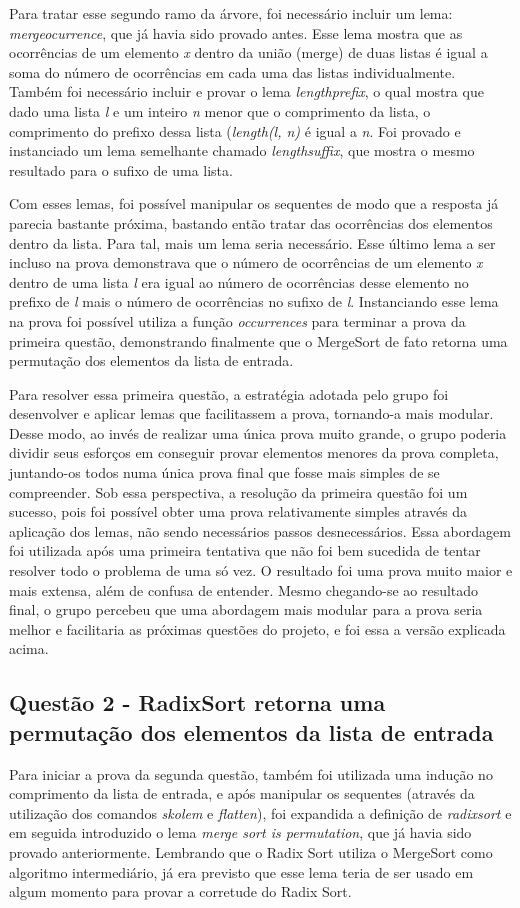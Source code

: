 \documentclass[12pt]{article}
\begin{document}
Para tratar esse segundo ramo da árvore, foi necessário incluir um lema: \textit{mergeocurrence}, que já havia sido provado antes. Esse lema mostra que as ocorrências de um elemento \textit{x} dentro da união (merge) de duas listas é igual a soma do número de ocorrências em cada uma das listas individualmente. Também foi necessário incluir e provar o lema \textit{lengthprefix}, o qual mostra que dado uma lista \textit{l} e um inteiro \textit{n} menor que o comprimento da lista, o comprimento do prefixo dessa lista (\textit{length(l, n)} é igual a \textit{n}. Foi provado e instanciado um lema semelhante chamado \textit{lengthsuffix}, que mostra o mesmo resultado para o sufixo de uma lista.

Com esses lemas, foi possível manipular os sequentes de modo que a resposta já parecia bastante próxima, bastando então tratar das ocorrências dos elementos dentro da lista. Para tal, mais um lema seria necessário. Esse último lema a ser incluso na prova demonstrava que o número de ocorrências de um elemento \textit{x} dentro de uma lista \textit{l} era igual ao número de ocorrências desse elemento no prefixo de \textit{l} mais o número de ocorrências no sufixo de \textit{l}. Instanciando esse lema na prova foi possível utiliza a função \textit{occurrences} para terminar a prova da primeira questão, demonstrando finalmente que o MergeSort de fato retorna uma permutação dos elementos da lista de entrada.

Para resolver essa primeira questão, a estratégia adotada pelo grupo foi desenvolver e aplicar lemas que facilitassem a prova, tornando-a mais modular. Desse modo, ao invés de realizar uma única prova muito grande, o grupo poderia dividir seus esforços em conseguir provar elementos menores da prova completa, juntando-os todos numa única prova final que fosse mais simples de se compreender. Sob essa perspectiva, a resolução da primeira questão foi um sucesso, pois foi possível obter uma prova relativamente simples através da aplicação dos lemas, não sendo necessários passos desnecessários. Essa abordagem foi utilizada após uma primeira tentativa que não foi bem sucedida de tentar resolver todo o problema de uma só vez. O resultado foi uma prova muito maior e mais extensa, além de confusa de entender. Mesmo chegando-se ao resultado final, o grupo percebeu que uma abordagem mais modular para a prova seria melhor e facilitaria as próximas questões do projeto, e foi essa a versão explicada acima.

\subsection{Questão 2 - RadixSort retorna uma permutação dos elementos da lista de entrada}
Para iniciar a prova da segunda questão, também foi utilizada uma indução no comprimento da lista de entrada, e após manipular os sequentes (através da utilização dos comandos \textit{skolem} e \textit{flatten}), foi expandida a definição de \textit{radixsort} e em seguida introduzido o lema \textit{merge sort is permutation}, que já havia sido provado anteriormente. Lembrando que o Radix Sort utiliza o MergeSort como algoritmo intermediário, já era previsto que esse lema teria de ser usado em algum momento para provar a corretude do Radix Sort.
\end{document}

